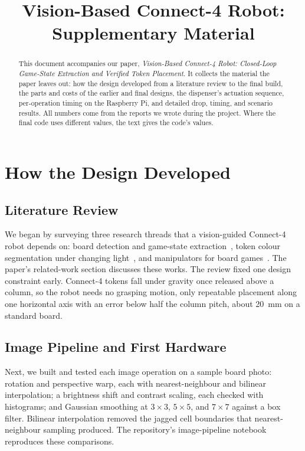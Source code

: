 \documentclass[conference]{IEEEtran}
\begin{document}
\title{Vision-Based Connect-4 Robot: Supplementary Material}

\author{%
}

\maketitle

\begin{abstract}
This document accompanies our paper, \emph{Vision-Based Connect-4 Robot: Closed-Loop Game-State Extraction and Verified Token Placement}. It collects the material the paper leaves out: how the design developed from a literature review to the final build, the parts and costs of the earlier and final designs, the dispenser's actuation sequence, per-operation timing on the Raspberry Pi, and detailed drop, timing, and scenario results. All numbers come from the reports we wrote during the project. Where the final code uses different values, the text gives the code's values.
\end{abstract}

\section{How the Design Developed}

\subsection{Literature Review}
We began by surveying three research threads that a vision-guided Connect-4 robot depends on: board detection and game-state extraction~\cite{Wolflein2021,Masouris2023}, token colour segmentation under changing light~\cite{Akis2024,Ayub2020}, and manipulators for board games~\cite{Matuszek2011}. The paper's related-work section discusses these works. The review fixed one design constraint early. Connect-4 tokens fall under gravity once released above a column, so the robot needs no grasping motion, only repeatable placement along one horizontal axis with an error below half the column pitch, about 20~mm on a standard board.

\subsection{Image Pipeline and First Hardware}
Next, we built and tested each image operation on a sample board photo: rotation and perspective warp, each with nearest-neighbour and bilinear interpolation; a brightness shift and contrast scaling, each checked with histograms; and Gaussian smoothing at $3\times3$, $5\times5$, and $7\times7$ against a box filter. Bilinear interpolation removed the jagged cell boundaries that nearest-neighbour sampling produced. The repository's image-pipeline notebook reproduces these comparisons.
\end{document}
